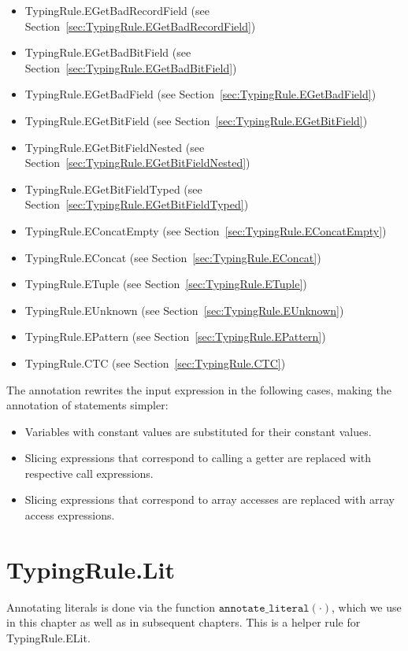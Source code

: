 \documentclass{book}
\newcommand\annotateliteral[1]{\texttt{annotate\_literal}(#1)}
\begin{document}
\begin{itemize}
\item TypingRule.EGetBadRecordField (see Section~\ref{sec:TypingRule.EGetBadRecordField})
\item TypingRule.EGetBadBitField (see Section~\ref{sec:TypingRule.EGetBadBitField})
\item TypingRule.EGetBadField (see Section~\ref{sec:TypingRule.EGetBadField})
\item TypingRule.EGetBitField (see Section~\ref{sec:TypingRule.EGetBitField})
\item TypingRule.EGetBitFieldNested (see Section~\ref{sec:TypingRule.EGetBitFieldNested})
\item TypingRule.EGetBitFieldTyped (see Section~\ref{sec:TypingRule.EGetBitFieldTyped})
\item TypingRule.EConcatEmpty (see Section~\ref{sec:TypingRule.EConcatEmpty})
\item TypingRule.EConcat (see Section~\ref{sec:TypingRule.EConcat})
\item TypingRule.ETuple (see Section~\ref{sec:TypingRule.ETuple})
\item TypingRule.EUnknown (see Section~\ref{sec:TypingRule.EUnknown})
\item TypingRule.EPattern (see Section~\ref{sec:TypingRule.EPattern})
\item TypingRule.CTC (see Section~\ref{sec:TypingRule.CTC})
\end{itemize}

The annotation rewrites the input expression in the following cases, making the annotation of statements simpler:
\begin{itemize}
  \item Variables with constant values are substituted for their constant values.
  \item Slicing expressions that correspond to calling a getter are replaced with respective call expressions.
  \item Slicing expressions that correspond to array accesses are replaced with array access expressions.
\end{itemize}

\section{TypingRule.Lit \label{sec:TypingRule.Lit}}

Annotating literals is done via the function $\annotateliteral{\cdot}$,
which we use in this chapter as well as in subsequent chapters.
This is a helper rule for TypingRule.ELit.
\end{document}
